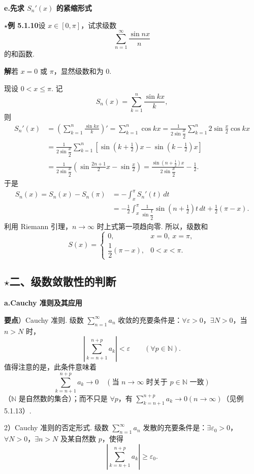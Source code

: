 \documentclass[UTF8,12pt,a4paper,fontset=fandol]{ctexart}
\begin{document}
\noindent\textbf{e.\quad 先求 $S_n'(x)$ 的紧缩形式}

\noindent\textbf{$\star$例 5.1.10}\quad 设 $x\in[0,\pi]$，试求级数
\[
  \sum_{n=1}^\infty \frac{\sin nx}{n}
\]
的和函数.

\noindent\textbf{解}\quad 若 $x=0$ 或 $\pi$，显然级数和为 $0$.

现设 $0<x\le\pi$. 记
\[
  S_n(x)=\sum_{k=1}^n\frac{\sin kx}{k},
\]
则
\[
\begin{aligned}
S_n'(x)
&=\left(\sum_{k=1}^n\frac{\sin kx}{k}\right)'
=\sum_{k=1}^n\cos kx
=\frac1{2\sin\dfrac x2}\sum_{k=1}^n 2\sin\frac x2\cos kx\\
&=\frac1{2\sin\dfrac x2}\sum_{k=1}^n
\left[\sin\left(k+\frac12\right)x-\sin\left(k-\frac12\right)x\right]\\
&=\frac1{2\sin\dfrac x2}\left(\sin\frac{2n+1}2x-\sin\frac x2\right)
=\frac{\sin\left(n+\frac12\right)x}{2\sin\dfrac x2}-\frac12.
\end{aligned}
\]
于是
\[
\begin{aligned}
S_n(x)=S_n(x)-S_n(\pi)
&=-\int_x^\pi S_n'(t)\,dt\\
&=-\frac12\int_x^\pi\frac1{\sin\dfrac t2}\sin\left(n+\frac12\right)t\,dt
  +\frac12(\pi-x).
\end{aligned}
\]
利用 Riemann 引理，$n\to\infty$ 时上式第一项趋向零. 所以，级数和
\[
  S(x)=
  \begin{cases}
  0, & x=0,\ x=\pi,\\[2mm]
  \dfrac12(\pi-x), & 0<x<\pi.
  \end{cases}
\]

\subsection*{$\star$二、级数敛散性的判断}

\noindent\textbf{a.\quad Cauchy 准则及其应用}

\noindent\textbf{要点}）Cauchy 准则. 级数 $\displaystyle\sum_{n=1}^\infty a_n$ 收敛的充要条件是：$\forall\varepsilon>0$，$\exists N>0$，当 $n>N$ 时，
\[
  \left|\sum_{k=n+1}^{n+p}a_k\right|<\varepsilon\qquad(\forall p\in\mathbb{N}).
\]
值得注意的是，此条件意味着
\[
  \sum_{k=n+1}^{n+p}a_k\to0\quad(\text{当 }n\to\infty\text{ 时关于 }p\in\mathbb{N}\text{ 一致})
\]
（$\mathbb{N}$ 是自然数的集合）；而不只是 $\forall p$，有 $\displaystyle\sum_{k=n+1}^{n+p}a_k\to0(n\to\infty)$（见例 5.1.13）.

2）Cauchy 准则的否定形式. 级数 $\displaystyle\sum_{n=1}^\infty a_n$ 发散的充要条件是：$\exists\varepsilon_0>0$，$\forall N>0$，$\exists n>N$ 及某自然数 $p$，使得
\[
  \left|\sum_{k=n+1}^{n+p}a_k\right|\ge\varepsilon_0.
\]
\end{document}
